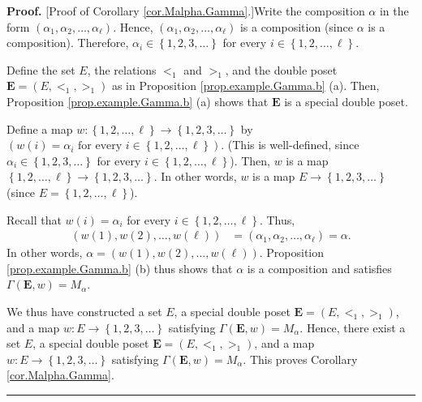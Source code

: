 \documentclass[numbers=enddot,12pt,final,onecolumn,notitlepage,abstracton]{scrartcl}
\theoremstyle{definition}
\newenvironment{proof}[1][Proof]{\noindent\textbf{#1.} }{\ \rule{0.5em}{0.5em}}
\newenvironment{verlong}{}{}
\begin{document}
\begin{verlong}
\begin{footnotesize}
\begin{proof}
[Proof of Corollary \ref{cor.Malpha.Gamma}.]Write the composition $\alpha$ in
the form $\left(  \alpha_{1},\alpha_{2},\ldots,\alpha_{\ell}\right)  $.
Hence, $\left(  \alpha_{1},\alpha_{2},\ldots,\alpha_{\ell}\right)  $ is a
composition (since $\alpha$ is a composition). Therefore, $\alpha_{i}%
\in\left\{  1,2,3,\ldots\right\}  $ for every $i\in\left\{  1,2,\ldots
,\ell\right\}  $.

Define the set $E$, the relations $<_{1}$ and $>_{1}$, and the double poset
${\mathbf{E}} = \left(  E, <_{1}, >_{1}\right)  $ as in Proposition
\ref{prop.example.Gamma.b} (a). Then, Proposition \ref{prop.example.Gamma.b}
(a) shows that $\mathbf{E}$ is a special double poset.

Define a map $w:\left\{  1,2,\ldots,\ell\right\}  \rightarrow\left\{
1,2,3,\ldots\right\}  $ by $\left(  w\left(  i\right)  =\alpha_{i}\text{ for
every }i\in\left\{  1,2,\ldots,\ell\right\}  \right)  $. (This is
well-defined, since $\alpha_{i}\in\left\{  1,2,3,\ldots\right\}  $ for every
$i\in\left\{  1,2,\ldots,\ell\right\}  $). Then, $w$ is a map $\left\{
1,2,\ldots,\ell\right\}  \rightarrow\left\{  1,2,3,\ldots\right\}  $. In other
words, $w$ is a map $E\rightarrow\left\{  1,2,3,\ldots\right\}  $ (since
$E=\left\{  1,2,\ldots,\ell\right\}  $).

Recall that $w\left(  i\right)  =\alpha_{i}$ for every $i\in\left\{
1,2,\ldots,\ell\right\}  $. Thus,
\begin{align*}
\left(  w\left(  1\right)  ,w\left(  2\right)  ,\ldots,w\left(  \ell\right)
\right)   &  =\left(  \alpha_{1},\alpha_{2},\ldots,\alpha_{\ell}\right)
=\alpha.
\end{align*}
In other words, $\alpha=\left(  w\left(  1\right)  ,w\left(  2\right)
,\ldots,w\left(  \ell\right)  \right)  $. Proposition
\ref{prop.example.Gamma.b} (b) thus shows that $\alpha$ is a composition and
satisfies $\Gamma\left(  {\mathbf{E}},w\right)  =M_{\alpha}$.

We thus have constructed a set $E$, a special double poset ${\mathbf{E}%
}=\left(  E,<_{1},>_{1}\right)  $, and a map $w:E\rightarrow\left\{
1,2,3,\ldots\right\}  $ satisfying $\Gamma\left(  {\mathbf{E}},w\right)
=M_{\alpha}$. Hence, there exist a set $E$, a special double poset
${\mathbf{E}}=\left(  E,<_{1},>_{1}\right)  $, and a map $w:E\rightarrow
\left\{  1,2,3,\ldots\right\}  $ satisfying $\Gamma\left(  {\mathbf{E}%
},w\right)  =M_{\alpha}$. This proves Corollary \ref{cor.Malpha.Gamma}.
\end{proof}


\end{footnotesize}
\end{verlong}
\end{document}
